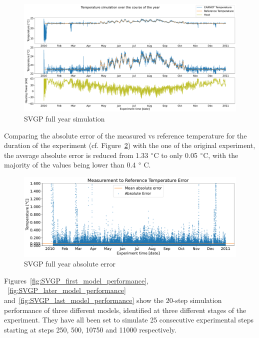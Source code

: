 \begin{figure}[ht]
    \centering
    \includegraphics[width =
    \textwidth]{Plots/1_SVGP_480pts_inf_window_12_averageYear_fullyear.pdf}
    \caption{SVGP full year simulation}
    \label{fig:SVGP_fullyear_simulation}
\end{figure}

\clearpage

Comparing the absolute error of the measured vs reference temperature for the
duration of the experiment (cf. Figure~\ref{fig:SVGP_fullyear_abserr}) with the
one of the original experiment, the average absolute error is reduced from 1.33
$\degree$C to only 0.05 $\degree$C, with the majority of the values being lower
than 0.4 $\degree$ C. 

\begin{figure}[ht]
    \centering
    \includegraphics[width =
    \textwidth]{Plots/1_SVGP_480pts_inf_window_12_averageYear_abserr.pdf}
    \caption{SVGP full year absolute error}
    \label{fig:SVGP_fullyear_abserr}
\end{figure}

Figures~\ref{fig:SVGP_first_model_performance},
~\ref{fig:SVGP_later_model_performance}
and~\ref{fig:SVGP_last_model_performance} show the 20-step simulation performance of three
different models, identified at three different stages of the experiment. They
have all been set to simulate 25 consecutive experimental steps starting at
steps 250, 500, 10750 and 11000 respectively.

